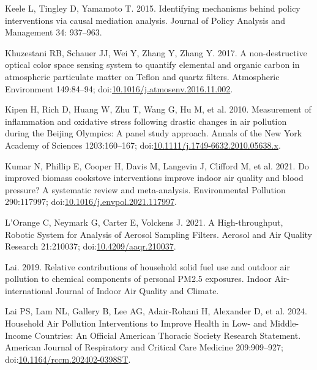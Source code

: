 \documentclass[
  letterpaper,
  DIV=11,
  numbers=noendperiod]{scrartcl}
\newlength{\cslhangindent}
\newenvironment{CSLReferences}[2] %
 {\begin{list}{}{%
  \setlength{\itemindent}{0pt}
  \setlength{\leftmargin}{0pt}
  \setlength{\parsep}{0pt}
  \ifodd #1
   \setlength{\leftmargin}{\cslhangindent}
   \setlength{\itemindent}{-1\cslhangindent}
  \fi
  \setlength{\itemsep}{#2\baselineskip}}}
 {\end{list}}
\begin{document}
\begin{CSLReferences}{1}{1}
Keele L, Tingley D, Yamamoto T. 2015. Identifying mechanisms behind
policy interventions via causal mediation analysis. Journal of Policy
Analysis and Management 34: 937--963.

Khuzestani RB, Schauer JJ, Wei Y, Zhang Y, Zhang Y. 2017. A
non-destructive optical color space sensing system to quantify elemental
and organic carbon in atmospheric particulate matter on {Teflon} and
quartz filters. Atmospheric Environment 149:84--94;
doi:\href{https://doi.org/10.1016/j.atmosenv.2016.11.002}{10.1016/j.atmosenv.2016.11.002}.

Kipen H, Rich D, Huang W, Zhu T, Wang G, Hu M, et al. 2010. Measurement
of inflammation and oxidative stress following drastic changes in air
pollution during the {Beijing Olympics}: A panel study approach. Annals
of the New York Academy of Sciences 1203:160--167;
doi:\href{https://doi.org/10.1111/j.1749-6632.2010.05638.x}{10.1111/j.1749-6632.2010.05638.x}.

Kumar N, Phillip E, Cooper H, Davis M, Langevin J, Clifford M, et al.
2021. Do improved biomass cookstove interventions improve indoor air
quality and blood pressure? {A} systematic review and meta-analysis.
Environmental Pollution 290:117997;
doi:\href{https://doi.org/10.1016/j.envpol.2021.117997}{10.1016/j.envpol.2021.117997}.

L'Orange C, Neymark G, Carter E, Volckens J. 2021. A {High-throughput},
{Robotic System} for {Analysis} of {Aerosol Sampling Filters}. Aerosol
and Air Quality Research 21:210037;
doi:\href{https://doi.org/10.4209/aaqr.210037}{10.4209/aaqr.210037}.

Lai. 2019. Relative contributions of household solid fuel use and
outdoor air pollution to chemical components of personal {PM2}.5
exposures. Indoor Air-international Journal of Indoor Air Quality and
Climate.

Lai PS, Lam NL, Gallery B, Lee AG, Adair-Rohani H, Alexander D, et al.
2024. Household {Air Pollution Interventions} to {Improve Health} in
{Low-} and {Middle-Income Countries}: {An Official American Thoracic
Society Research Statement}. American Journal of Respiratory and
Critical Care Medicine 209:909--927;
doi:\href{https://doi.org/10.1164/rccm.202402-0398ST}{10.1164/rccm.202402-0398ST}.


\end{CSLReferences}
\end{document}
